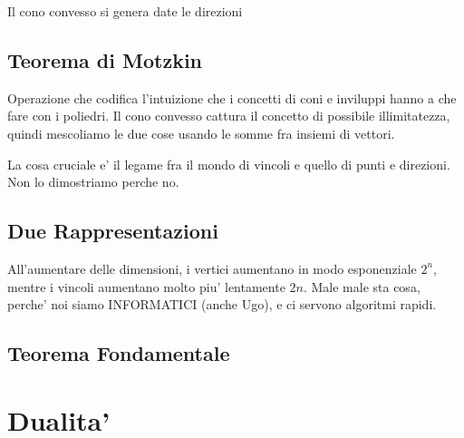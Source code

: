 Il cono convesso si genera date le direzioni

\subsection{Teorema di Motzkin}
Operazione che codifica l'intuizione che i concetti di coni e inviluppi hanno a che fare con i poliedri. Il cono convesso cattura il concetto di possibile illimitatezza, quindi mescoliamo le due cose usando le somme fra insiemi di vettori.

La cosa cruciale e' il legame fra il mondo di vincoli e quello di punti e direzioni. Non lo dimostriamo perche no.


\subsection{Due Rappresentazioni}
All'aumentare delle dimensioni, i vertici aumentano in modo esponenziale $ 2^{n} $, mentre i vincoli aumentano molto piu' lentamente $ 2n $. Male male sta cosa, perche' noi siamo INFORMATICI (anche Ugo), e ci servono algoritmi rapidi.

\subsection{Teorema Fondamentale}



\section{Dualita'}
% 
